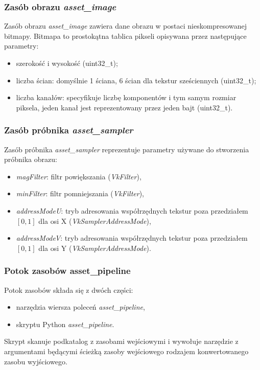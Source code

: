 \subsubsection{Zasób obrazu \textit{asset\_image}}
Zasób obrazu \textit{asset\_image} zawiera dane obrazu w postaci nieskompresowanej bitmapy.
Bitmapa to prostokątna tablica pikseli opisywana przez następujące parametry:
\begin{itemize}
	\item szerokość i wysokość (uint32\_t);
	\item liczba ścian: domyślnie 1 ściana, 6 ścian dla tekstur sześciennych (uint32\_t);
	\item liczba kanałów: specyfikuje liczbę komponentów i tym samym rozmiar piksela, jeden kanał jest reprezentowany przez jeden bajt (uint32\_t).
\end{itemize}

\subsubsection{Zasób próbnika \textit{asset\_sampler}}
Zasób próbnika \textit{asset\_sampler} reprezentuje parametry używane do stworzenia próbnika obrazu:
\begin{itemize}
	\item \textit{magFilter}: filtr powiększania (\textit{VkFilter}),
	\item \textit{minFilter}: filtr pomniejszania (\textit{VkFilter}),
	\item \textit{addressModeU}: tryb adresowania współrzędnych tekstur poza przedziałem $\left[0,1\right]$ dla osi X (\textit{VkSamplerAddressMode}),
	\item \textit{addressModeV}: tryb adresowania współrzędnych tekstur poza przedziałem $\left[0,1\right]$ dla osi Y (\textit{VkSamplerAddressMode}).
\end{itemize}

\subsubsection{Potok zasobów asset\_pipeline}
Potok zasobów składa się z dwóch części:
\begin{itemize}
	\item narzędzia wiersza poleceń \textit{asset\_pipeline},
	\item skryptu Python \textit{asset\_pipeline}.
\end{itemize}

Skrypt skanuje podkatalog z zasobami wejściowymi i wywołuje narzędzie z argumentami będącymi ścieżką zasoby wejściowego rodzajem konwertowanego zasobu wyjściowego.

